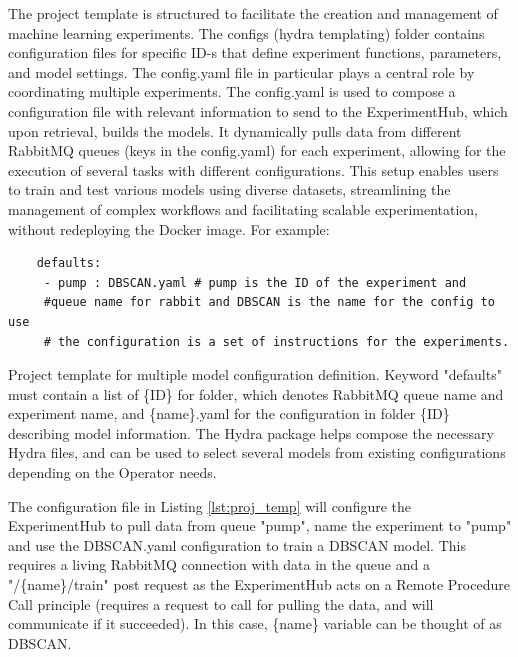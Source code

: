 \documentclass[preprint,12pt, a4paper]{elsarticle}
\begin{document}
The project template is structured to facilitate the creation and management of machine learning experiments. The configs (hydra templating) folder contains configuration files for specific ID-s that define experiment functions, parameters, and model settings. The config.yaml file in particular plays a central role by coordinating multiple experiments. 
The config.yaml is used to compose a configuration file with relevant information to send to the ExperimentHub, which upon retrieval, builds the models. It dynamically pulls data from different RabbitMQ queues (keys in the config.yaml) for each experiment, allowing for the execution of several tasks with different configurations. This setup enables users to train and test various models using diverse datasets, streamlining the management of complex workflows and facilitating scalable experimentation, without redeploying the Docker image. For example:
\begin{listing}[ht]
\begin{verbatim}
    defaults:
     - pump : DBSCAN.yaml # pump is the ID of the experiment and 
     #queue name for rabbit and DBSCAN is the name for the config to use
     # the configuration is a set of instructions for the experiments.
\end{verbatim}
\caption{Project template for multiple model configuration definition. Keyword "defaults" must contain a list of \{ID\} for folder, which denotes RabbitMQ queue name and experiment name, and \{name\}.yaml for the configuration in folder \{ID\} describing model information. The Hydra package helps compose the necessary Hydra files, and can be used to select several models from existing configurations depending on the Operator needs.}
\label{lst:proj_temp}
\end{listing}


The configuration file in Listing \ref{lst:proj_temp} will configure the ExperimentHub to pull data from queue "pump", name the experiment to "pump" and use the DBSCAN.yaml configuration to train a DBSCAN model. This requires a living RabbitMQ connection with data in the queue and a "/\{name\}/train" post request as the ExperimentHub acts on a Remote Procedure Call principle (requires a request to call for pulling the data, and will communicate if it succeeded). In this case, \{name\} variable can be thought of as DBSCAN.
\end{document}
